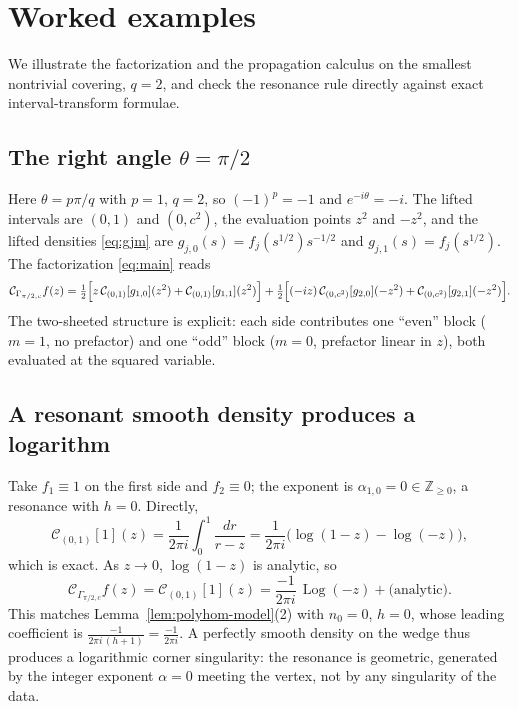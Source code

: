 \documentclass[pdflatex,sn-mathphys-num]{sn-jnl}%
\newcommand{\Z}{\mathbb{Z}}
\newcommand{\Cau}{\mathcal{C}}
\newcommand{\Log}{\operatorname{Log}}
\theoremstyle{thmstyleone}
\theoremstyle{thmstyletwo}
\theoremstyle{thmstylethree}
\begin{document}
\section{Worked examples}
\label{sec:examples}

We illustrate the factorization and the propagation calculus on the smallest
nontrivial covering, $q=2$, and check the resonance rule directly against exact
interval-transform formulae.

\subsection{The right angle \texorpdfstring{$\theta=\pi/2$}{theta=pi/2}}
Here $\theta=p\pi/q$ with $p=1$, $q=2$, so $(-1)^{p}=-1$ and
$e^{-i\theta}=-i$. The lifted intervals are $(0,1)$ and $(0,c^{2})$, the
evaluation points $z^{2}$ and $-z^{2}$, and the lifted densities
\eqref{eq:gjm} are $g_{j,0}(s)=f_j(s^{1/2})s^{-1/2}$ and
$g_{j,1}(s)=f_j(s^{1/2})$. The factorization \eqref{eq:main} reads
\begin{equation}\label{eq:rightangle}
  \Cau_{\Gamma_{\pi/2,c}}f(z)
  =\tfrac12\Bigl[z\,\Cau_{(0,1)}[g_{1,0}](z^{2})+\Cau_{(0,1)}[g_{1,1}](z^{2})\Bigr]
  +\tfrac12\Bigl[(-iz)\,\Cau_{(0,c^{2})}[g_{2,0}](-z^{2})
     +\Cau_{(0,c^{2})}[g_{2,1}](-z^{2})\Bigr].
\end{equation}
The two-sheeted structure is explicit: each side contributes one ``even'' block
($m=1$, no prefactor) and one ``odd'' block ($m=0$, prefactor linear in $z$),
both evaluated at the squared variable.

\subsection{A resonant smooth density produces a logarithm}
Take $f_1\equiv1$ on the first side and $f_2\equiv0$; the exponent is
$\alpha_{1,0}=0\in\Z_{\ge0}$, a resonance with $h=0$. Directly,
\begin{equation}\label{eq:const-exact}
  \Cau_{(0,1)}[1](z)
  =\frac{1}{2\pi i}\int_0^1\frac{dr}{r-z}
  =\frac{1}{2\pi i}\bigl(\log(1-z)-\log(-z)\bigr),
\end{equation}
which is exact. As $z\to0$, $\log(1-z)$ is analytic, so
\[
  \Cau_{\Gamma_{\pi/2,c}}f(z)=\Cau_{(0,1)}[1](z)
  =\frac{-1}{2\pi i}\,\Log(-z)+\bigl(\text{analytic}\bigr).
\]
This matches Lemma~\ref{lem:polyhom-model}(2) with $n_0=0$, $h=0$, whose leading
coefficient is $\frac{-1}{2\pi i\,(h+1)}=\frac{-1}{2\pi i}$. A perfectly smooth
density on the wedge thus produces a logarithmic corner singularity: the
resonance is geometric, generated by the integer exponent $\alpha=0$ meeting the
vertex, not by any singularity of the data.
\end{document}

